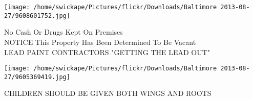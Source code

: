 \documentclass[10pt,letterpaper]{article}
\begin{document}
\vspace{0.25in}
\texttt{[image: /home/swickape/Pictures/flickr/Downloads/Baltimore 2013-08-27/9608601752.jpg]}

No Cash Or Drugs Kept On Premises\\
NOTICE This Property Has Been Determined To Be Vacant\\
LEAD PAINT CONTRACTORS "GETTING THE LEAD OUT"
\pagebreak

\texttt{[image: /home/swickape/Pictures/flickr/Downloads/Baltimore 2013-08-27/9605369419.jpg]}

CHILDREN SHOULD BE GIVEN BOTH WINGS AND ROOTS
\pagebreak
\end{document}

